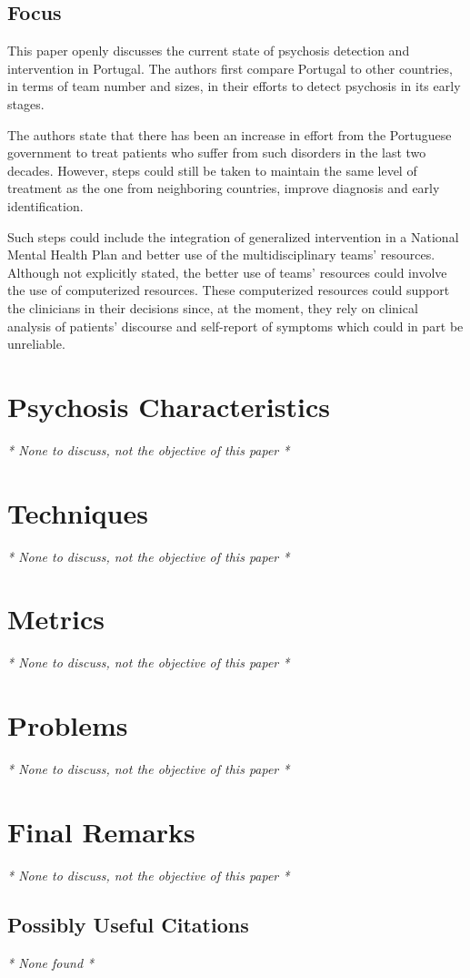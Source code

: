 \documentclass{Paper_Summary}
\begin{document}
\makepapertitle

\breakline

\begin{center}
    \section*{Focus}
\end{center}

    This paper openly discusses the current state of psychosis detection and intervention in Portugal. The authors first compare Portugal to other countries, in terms of team number and sizes, in their efforts to detect psychosis in its early stages.

    The authors state that there has been an increase in effort from the Portuguese government to treat patients who suffer from such disorders in the last two decades. However, steps could still be taken to maintain the same level of treatment as the one from neighboring countries, improve diagnosis and early identification.

    Such steps could include the integration of generalized intervention in a National Mental Health Plan and better use of the multidisciplinary teams' resources. Although not explicitly stated, the better use of teams' resources could involve the use of computerized resources. These computerized resources could support the clinicians in their decisions since, at the moment, they rely on clinical analysis of patients' discourse and self-report of symptoms which could in part be unreliable.

\breakline

\newpage

\section{Psychosis Characteristics}
\emph{* None to discuss, not the objective of this paper *}

\section{Techniques}
\emph{* None to discuss, not the objective of this paper *}

\section{Metrics}
\emph{* None to discuss, not the objective of this paper *}

\section{Problems}
\emph{* None to discuss, not the objective of this paper *}

\section{Final Remarks}
\emph{* None to discuss, not the objective of this paper *}

\breakline

\begin{center}
    \section*{Possibly Useful Citations}
\end{center}
\emph{* None found *}
\end{document}
